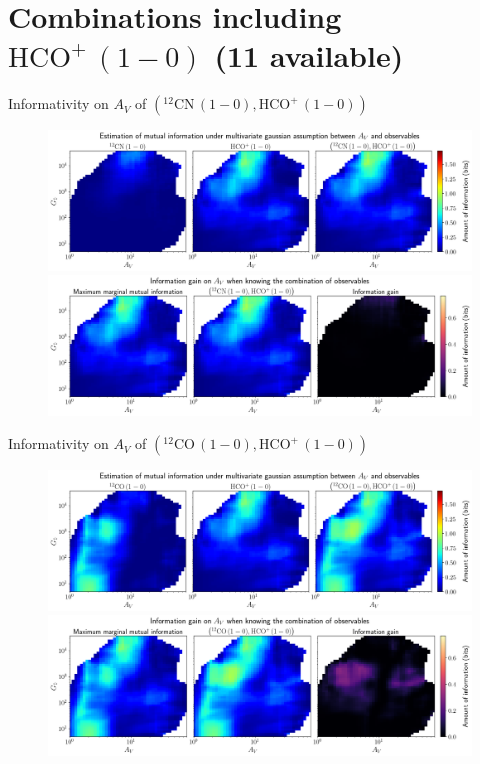 \documentclass{beamer}
\begin{document}
\section{Combinations including $\mathrm{HCO^+\,(1-0)}$ (11 available)}

\begin{frame}{Informativity on $A_V$ of $\left(\mathrm{^{12}CN\,(1-0)},\mathrm{HCO^+\,(1-0)}\right)$}
    \begin{figure}
        \centering
        \includegraphics[width=0.95\linewidth]{../linearinfogauss/av__12cn10_hcop10_linearinfogauss.png}
        \vfill
        \includegraphics[width=0.95\linewidth]{../linearinfogauss/av__12cn10_hcop10_linearinfogauss_gain.png}
    \end{figure}
\end{frame}

\begin{frame}{Informativity on $A_V$ of $\left(\mathrm{^{12}CO\,(1-0)},\mathrm{HCO^+\,(1-0)}\right)$}
    \begin{figure}
        \centering
        \includegraphics[width=0.95\linewidth]{../linearinfogauss/av__12co10_hcop10_linearinfogauss.png}
        \vfill
        \includegraphics[width=0.95\linewidth]{../linearinfogauss/av__12co10_hcop10_linearinfogauss_gain.png}
    \end{figure}
\end{frame}
\end{document}
